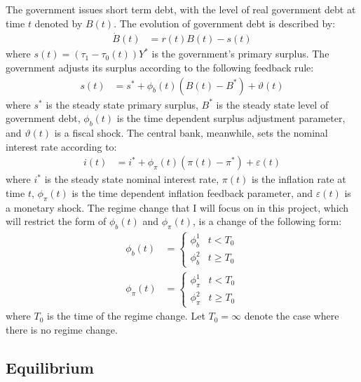 \documentclass[11pt]{article}
\begin{document}
The government issues short term debt, with the level of real government debt at time $t$ denoted by $B(t)$. The evolution of government debt is described by:
\begin{align*}
    \dot{B}(t) &= r(t)B(t) - s(t)
\end{align*}
where $s(t) = (\tau_1 - \tau_0(t))Y^*$ is the government's primary surplus. The government adjusts its surplus according to the following feedback rule:
\begin{align*}
    s(t) &= s^* + \phi_b(t)(B(t) - B^*) + \vartheta(t)
\end{align*}
where $s^*$ is the steady state primary surplus, $B^*$ is the steady state level of government debt, $\phi_b(t)$ is the time dependent surplus adjustment parameter, and $\vartheta(t)$ is a fiscal shock. The central bank, meanwhile, sets the nominal interest rate according to:
\begin{align*}
    i(t) &= i^* + \phi_{\pi}(t)(\pi(t) - \pi^*) + \varepsilon(t)
\end{align*}
where $i^*$ is the steady state nominal interest rate, $\pi(t)$ is the inflation rate at time $t$, $\phi_{\pi}(t)$ is the time dependent inflation feedback parameter, and $\varepsilon(t)$ is a monetary shock. The regime change that I will focus on in this project, which will restrict the form of $\phi_b(t)$ and $\phi_{\pi}(t)$, is a change of the following form:
\begin{align*}
    \phi_b(t) &= \begin{cases}
        \phi_b^1 & t < T_0 \\
        \phi_b^2 & t \geq T_0
    \end{cases} \\
    \phi_{\pi}(t) &= \begin{cases}
        \phi_{\pi}^1 & t < T_0 \\
        \phi_{\pi}^2 & t \geq T_0
    \end{cases}
\end{align*}
where $T_0$ is the time of the regime change. Let $T_0 = \infty$ denote the case where there is no regime change.

\subsection{Equilibrium}
\end{document}
